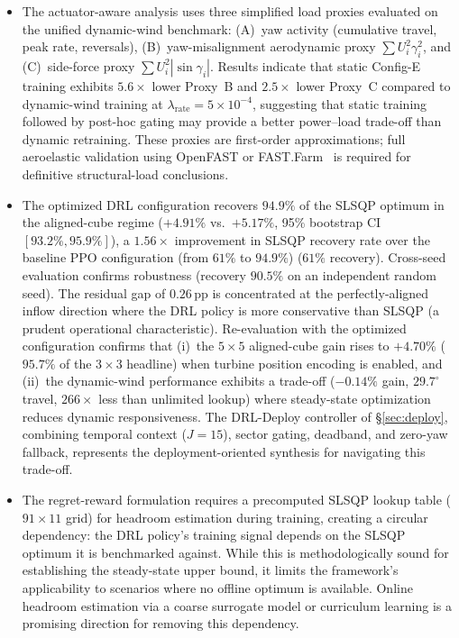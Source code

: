 \documentclass[final,5p,times]{elsarticle}
\begin{document}
\begin{itemize}
\item The actuator-aware analysis uses three simplified load proxies evaluated on the unified dynamic-wind benchmark: (A)~yaw activity (cumulative travel, peak rate, reversals), (B)~yaw-misalignment aerodynamic proxy $\sum U_i^2\gamma_i^2$, and (C)~side-force proxy $\sum U_i^2|\sin\gamma_i|$. Results indicate that static Config-E training exhibits $5.6{\times}$ lower Proxy~B and $2.5{\times}$ lower Proxy~C compared to dynamic-wind training at $\lambda_\mathrm{rate}{=}5{\times}10^{-4}$, suggesting that static training followed by post-hoc gating may provide a better power--load trade-off than dynamic retraining. These proxies are first-order approximations; full aeroelastic validation using OpenFAST or FAST.Farm~\citep{Damiani2018} is required for definitive structural-load conclusions.
\item The optimized DRL configuration recovers $94.9\%$ of the SLSQP optimum in the aligned-cube regime ($+4.91\%$ vs.\ $+5.17\%$, 95\% bootstrap CI $[93.2\%, 95.9\%]$), a $1.56{\times}$ improvement in SLSQP recovery rate over the baseline PPO configuration (from $61\%$ to $94.9\%$) ($61\%$ recovery). Cross-seed evaluation confirms robustness (recovery $90.5\%$ on an independent random seed). The residual gap of $0.26$\,pp is concentrated at the perfectly-aligned inflow direction where the DRL policy is more conservative than SLSQP (a prudent operational characteristic). Re-evaluation with the optimized configuration confirms that (i)~the $5{\times}5$ aligned-cube gain rises to $+4.70\%$ ($95.7\%$ of the $3{\times}3$ headline) when turbine position encoding is enabled, and (ii)~the dynamic-wind performance exhibits a trade-off ($-0.14\%$ gain, $29.7^\circ$ travel, $266{\times}$ less than unlimited lookup) where steady-state optimization reduces dynamic responsiveness. The DRL-Deploy controller of \S\ref{sec:deploy}, combining temporal context ($J{=}15$), sector gating, deadband, and zero-yaw fallback, represents the deployment-oriented synthesis for navigating this trade-off.
\item The regret-reward formulation requires a precomputed SLSQP lookup table ($91{\times}11$ grid) for headroom estimation during training, creating a circular dependency: the DRL policy's training signal depends on the SLSQP optimum it is benchmarked against. While this is methodologically sound for establishing the steady-state upper bound, it limits the framework's applicability to scenarios where no offline optimum is available. Online headroom estimation via a coarse surrogate model or curriculum learning is a promising direction for removing this dependency.

\end{itemize}
\end{document}
